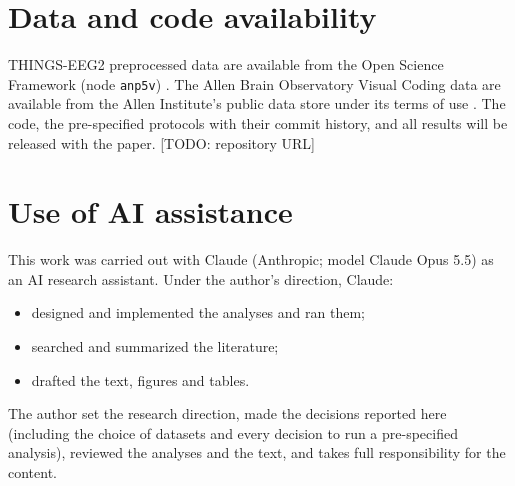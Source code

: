 \documentclass[11pt]{article}
\newcommand{\todo}[1]{\textcolor{red!70!black}{[TODO: #1]}}
\begin{document}
\section*{Data and code availability}
THINGS-EEG2 preprocessed data are available from the Open Science Framework (node
\texttt{anp5v}) \citep{gifford2022}. The Allen Brain Observatory Visual Coding data are
available from the Allen Institute's public data store under its terms of use
\citep{devries2020}. The code, the pre-specified protocols with their commit history, and all
results will be released with the paper. \todo{repository URL}

\section*{Use of AI assistance}
This work was carried out with Claude (Anthropic; model Claude Opus 5.5) as an AI research
assistant. Under the author's direction, Claude:
\begin{itemize}
  \item designed and implemented the analyses and ran them;
  \item searched and summarized the literature;
  \item drafted the text, figures and tables.
\end{itemize}
The author set the research direction, made the decisions reported here (including the choice
of datasets and every decision to run a pre-specified analysis), reviewed the analyses and the
text, and takes full responsibility for the content.



\end{document}
